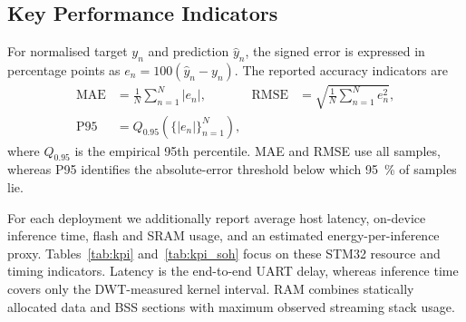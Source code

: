 \documentclass[review]{elsarticle}
\begin{document}
\subsection{Key Performance Indicators}
For normalised target $y_n$ and prediction $\hat{y}_n$, the signed error is expressed in percentage points as $e_n=100(\hat{y}_n-y_n)$. The reported accuracy indicators are
\begin{align}
    \mathrm{MAE} &= \frac{1}{N}\sum_{n=1}^{N}|e_n|, &
    \mathrm{RMSE} &= \sqrt{\frac{1}{N}\sum_{n=1}^{N}e_n^2},\label{eq:error_metrics}\\
    \mathrm{P95} &= Q_{0.95}\!\left(\{|e_n|\}_{n=1}^{N}\right),
\end{align}
where $Q_{0.95}$ is the empirical 95th percentile. MAE and RMSE use all samples, whereas P95 identifies the absolute-error threshold below which 95~\% of samples lie.

For each deployment we additionally report average host latency, on-device inference time, flash and SRAM usage, and an estimated energy-per-inference proxy. Tables~\ref{tab:kpi} and~\ref{tab:kpi_soh} focus on these STM32 resource and timing indicators. Latency is the end-to-end UART delay, whereas inference time covers only the DWT-measured kernel interval. RAM combines statically allocated data and BSS sections with maximum observed streaming stack usage.
\end{document}
